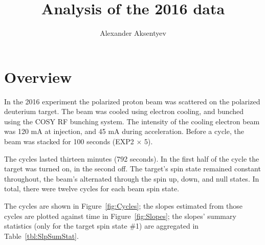 \documentclass{article}
\begin{document}
	\title{Analysis of the 2016 data}
	\author{Alexander Aksentyev}
	\maketitle
	
\section{Overview}

In the 2016 experiment the polarized proton beam was scattered on the polarized deuterium target. The beam was cooled using electron cooling, and bunched using the COSY RF bunching system. The intensity of the cooling electron beam was 120 mA at injection, and 45 mA during acceleration. Before a cycle, the beam was stacked for 100 seconds (EXP2 $\times$ 5).

The cycles lasted thirteen minutes (792 seconds). In the first half of the cycle the target was turned on, in the second off. The target's spin state remained constant throughout, the beam's alternated through the spin up, down, and null states. In total, there were twelve cycles for each beam spin state. 

The cycles are shown in Figure~\ref{fig:Cycles}; the slopes estimated from those cycles are plotted against time in Figure~\ref{fig:Slopes}; the slopes' summary statistics (only for the target spin state \#1) are aggregated in Table~\ref{tbl:SlpSumStat}.
\end{document}
